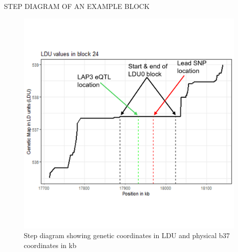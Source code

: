 \documentclass{article}
\begin{document}
STEP DIAGRAM OF AN EXAMPLE BLOCK
\newpage
\begin{figure}[hbt!]
    \centering
    \includegraphics[width=1\linewidth]{Thesis/thesis images/exampleblock.png}
    \caption{Step diagram showing genetic coordinates in LDU and physical b37 coordinates in kb}
    \label{fig:enter-label}
\end{figure}
\end{document}
